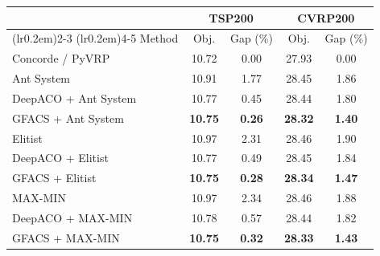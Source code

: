 \begin{tabular}{lcccc}
\toprule[1.0pt]
\multicolumn{1}{c}{} & \multicolumn{2}{c}{TSP200} & \multicolumn{2}{c}{CVRP200}\\
\cmidrule[0.5pt](lr{0.2em}){2-3}
\cmidrule[0.5pt](lr{0.2em}){4-5}
Method & Obj. & Gap (\%) & Obj. & Gap (\%) \\
\midrule
Concorde / PyVRP & 10.72 & 0.00 & 27.93 & 0.00 \\
\midrule
Ant System & 10.91 & 1.77 & 28.45 & 1.86 \\
DeepACO + Ant System & 10.77 & 0.45 & 28.44 & 1.80 \\
GFACS + Ant System & \textbf{10.75} & \textbf{0.26} & \textbf{28.32} & \textbf{1.40} \\
\midrule
Elitist & 10.97 & 2.31 & 28.46 & 1.90 \\
DeepACO + Elitist & 10.77 & 0.49 & 28.45 & 1.84 \\
GFACS + Elitist & \textbf{10.75} & \textbf{0.28} & \textbf{28.34} & \textbf{1.47} \\
\midrule
MAX-MIN & 10.97 & 2.34 & 28.46 & 1.88 \\
DeepACO + MAX-MIN & 10.78 & 0.57 & 28.44 & 1.82 \\
GFACS + MAX-MIN & \textbf{10.75} & \textbf{0.32} & \textbf{28.33} & \textbf{1.43} \\
\bottomrule
\end{tabular}